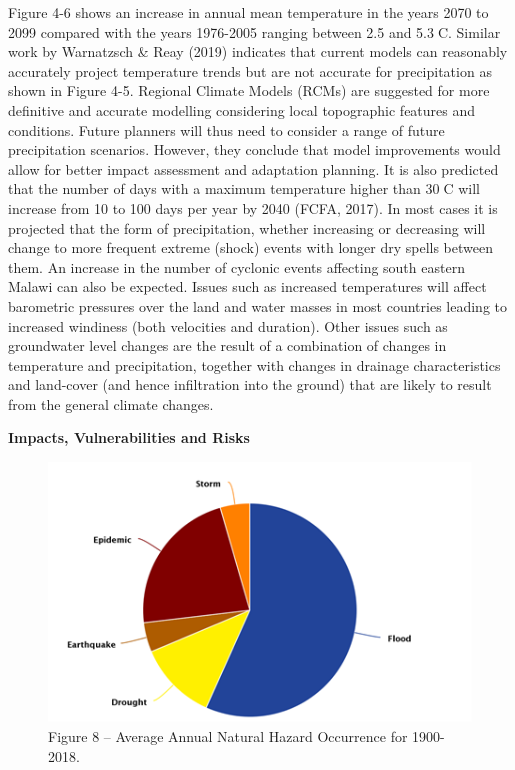 \documentclass[
]{book}
\begin{document}
Figure 4-6 shows an increase in annual mean temperature in the years 2070 to 2099 compared with the years 1976-2005 ranging between 2.5 and 5.3C. Similar work by Warnatzsch \& Reay (2019) indicates that current models can reasonably accurately project temperature trends but are not accurate for precipitation as shown in Figure 4-5. Regional Climate Models (RCMs) are suggested for more definitive and accurate modelling considering local topographic features and conditions. Future planners will thus need to consider a range of future precipitation scenarios. However, they conclude that model improvements would allow for better impact assessment and adaptation planning.
It is also predicted that the number of days with a maximum temperature higher than 30C will increase from 10 to 100 days per year by 2040 (FCFA, 2017).
In most cases it is projected that the form of precipitation, whether increasing or decreasing will change to more frequent extreme (shock) events with longer dry spells between them. An increase in the number of cyclonic events affecting south eastern Malawi can also be expected.
Issues such as increased temperatures will affect barometric pressures over the land and water masses in most countries leading to increased windiness (both velocities and duration). Other issues such as groundwater level changes are the result of a combination of changes in temperature and precipitation, together with changes in drainage characteristics and land-cover (and hence infiltration into the ground) that are likely to result from the general climate changes.

\textbf{Impacts, Vulnerabilities and Risks}

\begin{figure}
\centering
\includegraphics{images/hazards.png}
\caption{Figure 8 -- Average Annual Natural Hazard Occurrence for 1900-2018.}
\end{figure}
\end{document}
